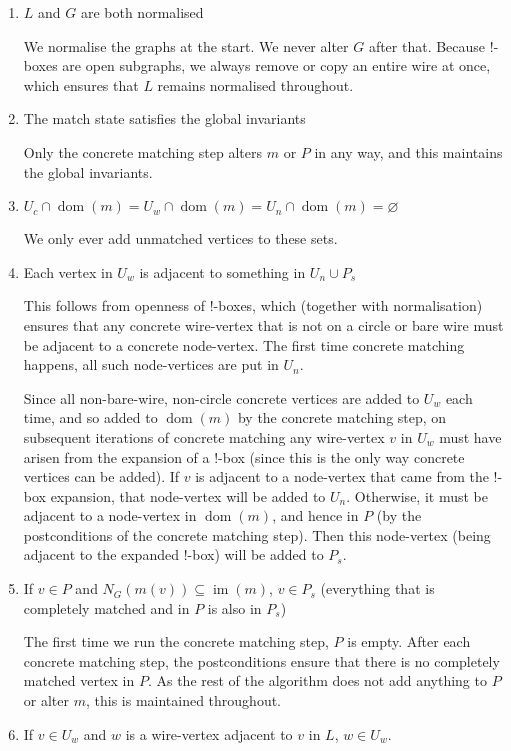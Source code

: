 \documentclass{article}
\DeclareMathOperator{\dom}{dom}
\DeclareMathOperator{\im}{im}
\begin{document}
\begin{enumerate}[label=(\roman*),ref=(\roman*)]
  \item $L$ and $G$ are both normalised

  We normalise the graphs at the start.  We never alter $G$ after that.  Because $!$-boxes are open subgraphs, we always remove or copy an entire wire at once, which ensures that $L$ remains normalised throughout.
  \item The match state satisfies the global invariants

  Only the concrete matching step alters $m$ or $P$ in any way, and this maintains the global invariants.
  \item $U_c\cap\dom(m) = U_w\cap\dom(m) = U_n\cap\dom(m) = \varnothing$

  We only ever add unmatched vertices to these sets.
  \item Each vertex in $U_w$ is adjacent to something in $U_n\cup P_s$

  This follows from openness of $!$-boxes, which (together with normalisation) ensures that any concrete wire-vertex that is not on a circle or bare wire must be adjacent to a concrete node-vertex.  The first time concrete matching happens, all such node-vertices are put in $U_n$.
  
  Since all non-bare-wire, non-circle concrete vertices are added to $U_w$ each time, and so added to $\dom(m)$ by the concrete matching step, on subsequent iterations of concrete matching any wire-vertex $v$ in $U_w$ must have arisen from the expansion of a $!$-box (since this is the only way concrete vertices can be added).  If $v$ is adjacent to a node-vertex that came from the $!$-box expansion, that node-vertex will be added to $U_n$.  Otherwise, it must be adjacent to a node-vertex in $\dom(m)$, and hence in $P$ (by the postconditions of the concrete matching step).  Then this node-vertex (being adjacent to the expanded $!$-box) will be added to $P_s$.
  \item If $v \in P$ and $N_G(m(v)) \subseteq \im(m)$, $v \in P_s$ (everything that is completely matched and in $P$ is also in $P_s$)

  The first time we run the concrete matching step, $P$ is empty.  After each concrete matching step, the postconditions ensure that there is no completely matched vertex in $P$.  As the rest of the algorithm does not add anything to $P$ or alter $m$, this is maintained throughout.
  \item If $v \in U_w$ and $w$ is a wire-vertex adjacent to $v$ in $L$, $w \in U_w$.


\end{enumerate}
\end{document}
